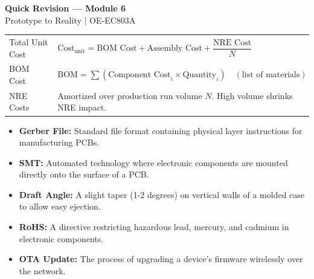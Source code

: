 \documentclass[12pt,a4paper]{article}
\renewcommand{\arraystretch}{1.45}
\begin{document}
\newpage

\begin{center}
  {\large\bfseries\color{myred} Quick Revision — Module 6}\\[3pt]
  {\small\color{mydark} Prototype to Reality $|$ OE-EC803A}
\end{center}
\noindent{\color{myred}\rule{\linewidth}{1.2pt}}
\vspace{8pt}

\begin{tcolorbox}[formulabox, title={\textbf{Key Cost and Amortization Formulas}}]
\renewcommand{\arraystretch}{1.35}
\begin{tabularx}{\linewidth}{B{5.0cm} X}
  Total Unit Cost & $\text{Cost}_{\text{unit}} = \text{BOM Cost} + \text{Assembly Cost} + \dfrac{\text{NRE Cost}}{N}$ \\[4pt]
  BOM Cost & $\text{BOM} = \sum (\text{Component Cost}_i \times \text{Quantity}_i) \quad (\text{list of materials})$ \\[4pt]
  NRE Costs & Amortized over production run volume $N$. High volume shrinks NRE impact.
\end{tabularx}
\end{tcolorbox}

\vspace{6pt}

\begin{tcolorbox}[defbox, title={\textbf{One-Line Definitions}}]
\begin{itemize}[leftmargin=*, itemsep=3pt, topsep=0pt]
  \item \textbf{Gerber File:} Standard file format containing physical layer instructions for manufacturing PCBs.
  \item \textbf{SMT:} Automated technology where electronic components are mounted directly onto the surface of a PCB.
  \item \textbf{Draft Angle:} A slight taper (1-2 degrees) on vertical walls of a molded case to allow easy ejection.
  \item \textbf{RoHS:} A directive restricting hazardous lead, mercury, and cadmium in electronic components.
  \item \textbf{OTA Update:} The process of upgrading a device's firmware wirelessly over the network.
\end{itemize}
\end{tcolorbox}
\end{document}

